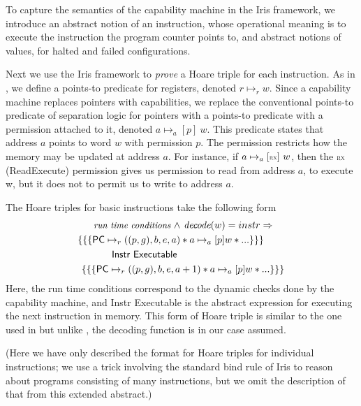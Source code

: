 \documentclass[sigplan,review]{acmart}\settopmatter{printfolios=true,printccs=false,printacmref=false}
\begin{document}
To capture the semantics of the capability machine in the Iris framework, we introduce an abstract notion of an instruction, whose operational meaning is to execute the instruction the program counter points to, and abstract notions of values, for halted and failed configurations.

Next we use the Iris framework to \emph{prove} a Hoare triple for each instruction.
As in \cite{Jensen:2013}, we define a points-to predicate for registers, denoted $r \mapsto_r w$.
Since a capability machine replaces pointers with capabilities, we replace the conventional points-to predicate of separation logic for pointers with a points-to predicate with a permission attached to it, denoted
$a \mapsto_a[p]~w$. 
This predicate states that address $a$ points to word $w$ with permission $p$.
The permission restricts how the memory may be updated at address $a$.
For instance, if $a \mapsto_a[\textsc{\tiny RX}]~w$, then the $\textsc{\tiny RX}$ (ReadExecute)
permission gives us permission to read from address $a$, to execute w, but it does not to permit us to write to address $a$.

The Hoare triples for basic instructions take the following form
\begin{align*}
\small
	\textit{run time conditions } \wedge &\textit{ decode}(w) = instr \Rightarrow  \\
	\{\{\{ \textsf{PC} \mapsto_r ((p,g),b,e,a) &* a \mapsto_a[p] w * ... \}\}\} \\ 
	\textsf{Instr Executable }\\
	\{\{\{\textsf{PC} \mapsto_r ((p,g),b,e,a&+1) * a \mapsto_a[p] w * ... \}\}\}
\end{align*} 
Here, the run time conditions correspond to the dynamic checks done by the capability machine, and \textsf{Instr Executable} is the abstract expression for executing the next instruction in memory.
This form of Hoare triple is similar to the one used in \cite{Jensen:2013} but
unlike \cite{Jensen:2013}, the decoding function is in our case assumed.

(Here we have only described the format for Hoare triples for individual instructions; we use a trick involving the standard bind rule of Iris to reason about programs consisting of many instructions, but we omit the description of that from this extended abstract.)
\end{document}
